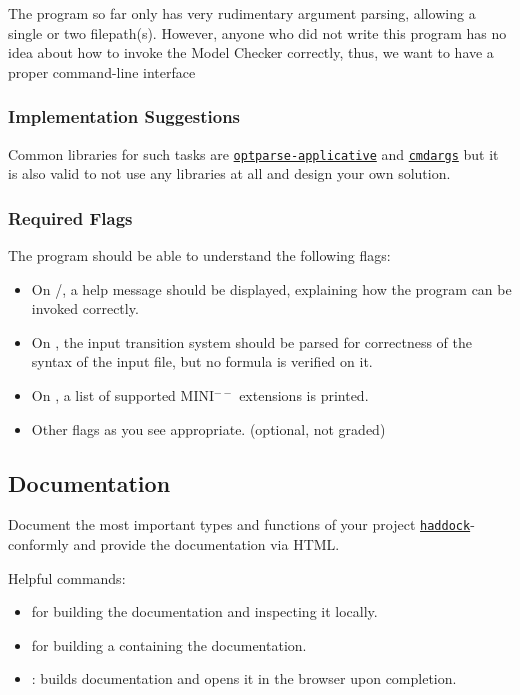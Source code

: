 \documentclass{article}
\begin{document}
The program so far only has very rudimentary argument parsing, allowing a single or two filepath(s). However, anyone who did not write this program has no idea about how to invoke the Model Checker correctly, thus, we want to have a proper command-line interface

\subsubsection*{Implementation Suggestions}

Common libraries for such tasks are \href{https://hackage.haskell.org/package/optparse-applicative}{\texttt{optparse-applicative}} 
and \href{https://hackage.haskell.org/package/cmdargs}{\texttt{cmdargs}} but it is also valid to not use any libraries at all 
and design your own solution.

\subsubsection*{Required Flags}

The program should be able to understand the following flags:

\begin{itemize}
\item On /, a help message should be displayed, explaining how the program can be invoked correctly.
\item On , the input transition system should be parsed for correctness of the syntax of the input file, but no formula is verified on it.
\item On , a list of supported MINI$^{--}$ extensions is printed.
\item Other flags as you see appropriate. (optional, not graded)
\end{itemize}

\subsection{Documentation}

Document the most important types and functions of your project \href{https://haskell-haddock.readthedocs.io/en/latest/markup.html}{\texttt{haddock}}-conformly and provide the documentation via HTML.

Helpful commands:

\begin{itemize}
\item {} for building the documentation and inspecting it locally.
\item {} for building a  containing the documentation.
\item {}: builds documentation and opens it in the browser upon completion.
\end{itemize}
\end{document}
